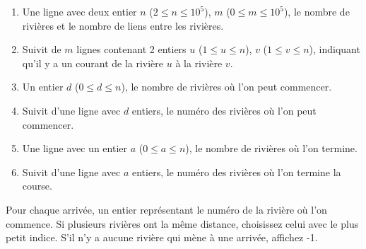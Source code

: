 \begin{Input}
    \begin{enumerate}
        \item Une ligne avec deux entier $n$ ($2 \le n \le 10^5$), $m$ ($0 \le m \le 10^5$), le nombre de rivières et le nombre de liens entre les rivières.
        \item Suivit de $m$ lignes contenant 2 entiers $u$ ($1 \le u \le n$), $v$ ($1 \le v \le n$), indiquant qu'il y a un courant de la rivière $u$ à la rivière $v$.
        \item Un entier $d$ ($ 0 \le d \le n$), le nombre de rivières où l'on peut commencer.
        \item Suivit d'une ligne avec $d$ entiers, le numéro des rivières où l'on peut commencer.
        \item Une ligne avec un entier $a$ ($ 0 \le a \le n$), le nombre de rivières où l'on termine.
        \item Suivit d'une ligne avec $a$ entiers, le numéro des rivières où l'on termine la course. 
    \end{enumerate}
   
\end{Input}

\begin{Output}
    Pour chaque arrivée, un entier représentant le numéro de la rivière où l'on commence. Si plusieurs rivières ont la même distance, choisissez celui avec le plus petit indice.
    S'il n'y a aucune rivière qui mène à une arrivée, affichez -1.
\end{Output}
